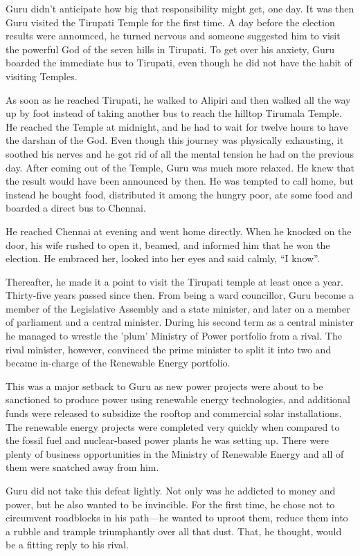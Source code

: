 Guru didn't anticipate how big that responsibility might get, one day. It was
then Guru visited the Tirupati Temple for the first time. A day before the
election results were announced, he turned nervous and someone suggested him to
visit the powerful God of the seven hills in Tirupati. To get over his anxiety,
Guru boarded the immediate bus to Tirupati, even though he did not have the
habit of visiting Temples.

As soon as he reached Tirupati, he walked to Alipiri and then walked all the way
up by foot instead of taking another bus to reach the hilltop Tirumala Temple.
He reached the Temple at midnight, and he had to wait for twelve hours to have
the darshan of the God. Even though this journey was physically exhausting, it
soothed his nerves and he got rid of all the mental tension he had on the
previous day. After coming out of the Temple, Guru was much more relaxed. He
knew that the result would have been announced by then. He was tempted to call
home, but instead he bought food, distributed it among the hungry poor, ate some
food and boarded a direct bus to Chennai.

He reached Chennai at evening and went home directly. When he knocked on the
door, his
wife rushed to open it, beamed, and informed him that he won the election. He
embraced her, looked into her eyes and said calmly, “I know”.

Thereafter, he made it a point to visit the Tirupati temple at least once a
year. Thirty-five years passed since then. From being a ward councillor, Guru
become a member of the Legislative Assembly and a state minister, and later on
a member of parliament and a central minister. During his second term as a central
minister he managed to wrestle the 'plum' Ministry of Power portfolio from a rival.
The rival minister, however, convinced the prime minister to split it
into two and became in-charge of the Renewable Energy portfolio.

This was a major setback to Guru as new power projects were about to be
sanctioned to produce power using renewable energy technologies, and additional
funds were released to subsidize the rooftop and commercial solar installations.
The renewable energy projects were completed very quickly when compared to the
fossil fuel and nuclear-based power plants he was setting up. There were plenty of
business opportunities in the Ministry of Renewable Energy and all of them were
snatched away from him.

Guru did not take this defeat lightly. Not only was he addicted to money and
power, but he also wanted to be invincible. For the first time, he chose not to
circumvent roadblocks in his path—he wanted to uproot them, reduce them into a
rubble and trample triumphantly over all that dust. That, he thought, would be a
fitting reply to his rival.
